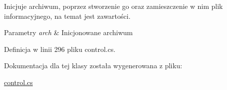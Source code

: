 Inicjuje archiwum, poprzez stworzenie go oraz zamieszczenie w nim plik informacyjnego, na temat jest zawartości. 


\begin{DoxyParams}{Parametry}
{\em arch} & Inicjonowane archiwum\\
\hline
\end{DoxyParams}


Definicja w linii 296 pliku control.\+cs.



Dokumentacja dla tej klasy została wygenerowana z pliku\+:\begin{DoxyCompactItemize}
\item 
\hyperlink{control_8cs}{control.\+cs}\end{DoxyCompactItemize}
